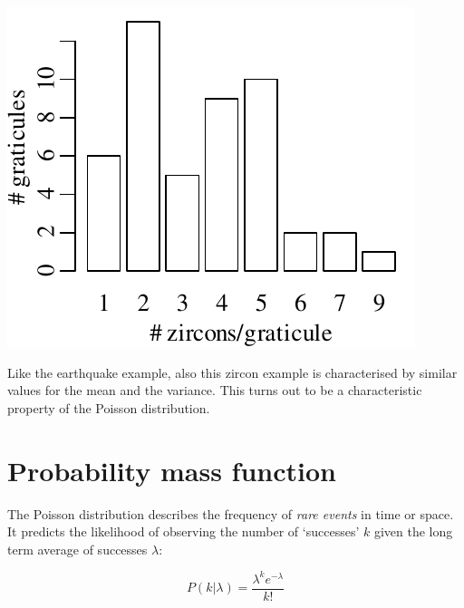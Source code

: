 \noindent\begin{minipage}[t][][b]{.3\textwidth}
  \includegraphics[width=\textwidth]{../figures/zirconhist.pdf}\\
\end{minipage}
\begin{minipage}[t][][t]{.7\textwidth}
  \label{fig:zirconhist}
\end{minipage}

Like the earthquake example, also this zircon example is characterised
by similar values for the mean and the variance. This turns out to be
a characteristic property of the Poisson distribution.

\section{Probability mass function}
\label{sec:PMF}

The Poisson distribution describes the frequency of \textit{rare
  events} in time or space.  It predicts the likelihood of observing
the number of `successes' $k$ given the long term average of successes
$\lambda$:

\begin{equation}
  P(k|\lambda) = \frac{\lambda^k e^{-\lambda}}{k!}
  \label{eq:poispmf}
\end{equation}

